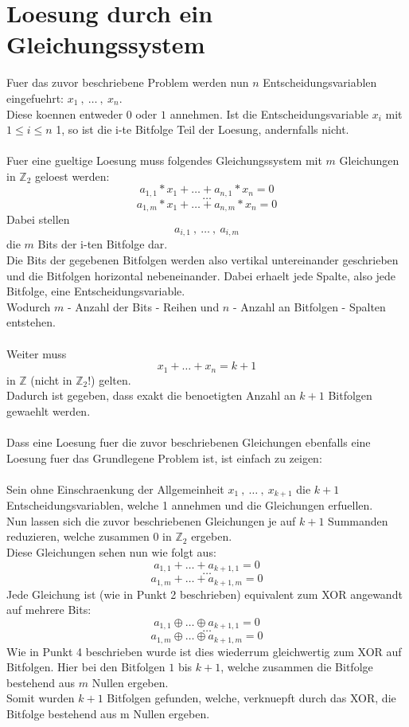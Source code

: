 \documentclass[a4paper,10pt,ngerman]{scrartcl}
\begin{document}
\section{Loesung durch ein Gleichungssystem}
Fuer das zuvor beschriebene Problem werden nun \(n\) Entscheidungsvariablen eingefuehrt: \(x_1 \ , \ \dots \ , \ x_n\).\\
Diese koennen entweder \(0\) oder \(1\) annehmen. Ist die Entscheidungsvariable \(x_i\) mit \(1 \leq i \leq n\) 1, so ist die i-te Bitfolge Teil der Loesung, andernfalls nicht.\\\\
Fuer eine gueltige Loesung muss folgendes Gleichungssystem mit \(m\) Gleichungen in \(\mathbb{Z}_{2}\) geloest werden:\\
\[a_{1, 1} * x_1 + \dots + a_{n, 1} * x_n = 0\]
\[\dots\]
\[a_{1, m} * x_1 + \dots + a_{n, m}  * x_n = 0\]
Dabei stellen 
\[a_{i, 1} \ , \ \dots \ , \ a_{i, m}\]
die \(m\) Bits der i-ten Bitfolge dar.\\
Die Bits der gegebenen Bitfolgen werden also vertikal untereinander geschrieben und die Bitfolgen horizontal nebeneinander. Dabei erhaelt jede Spalte, also jede Bitfolge, eine Entscheidungsvariable.\\
Wodurch \(m\) - Anzahl der Bits - Reihen und \(n\) - Anzahl an Bitfolgen - Spalten entstehen.\\\\
Weiter muss 
\[x_1 + \dots + x_n = k + 1\]
in \(\mathbb{Z}\) (nicht in \(\mathbb{Z}_{2}\)!) gelten.\\
Dadurch ist gegeben, dass exakt die benoetigten Anzahl an \(k + 1\) Bitfolgen gewaehlt werden.\\\\
Dass eine Loesung fuer die zuvor beschriebenen Gleichungen ebenfalls eine Loesung fuer das Grundlegene Problem ist, ist einfach zu zeigen:\\\\
Sein ohne Einschraenkung der Allgemeinheit \(x_1 \ , \ \dots \ , \ x_{k+1}\) die \(k + 1\) Entscheidungsvariablen, welche 1 annehmen und die Gleichungen erfuellen.\\
Nun lassen sich die zuvor beschriebenen Gleichungen je auf \(k + 1\) Summanden reduzieren, welche zusammen 0 in \(\mathbb{Z}_{2}\) ergeben.\\
Diese Gleichungen sehen nun wie folgt aus:
\[a_{1, 1} + \dots + a_{k+1, 1} = 0\]
\[\dots\]
\[a_{1, m} + \dots + a_{k+1, m} = 0\]
Jede Gleichung ist (wie in Punkt 2 beschrieben) equivalent zum XOR angewandt auf mehrere Bits:
\[a_{1, 1} \oplus \dots \oplus a_{k+1, 1} = 0\]
\[\dots\]
\[a_{1, m} \oplus \dots \oplus a_{k+1, m} = 0\]
Wie in Punkt 4 beschrieben wurde ist dies wiederrum gleichwertig zum XOR auf Bitfolgen. Hier bei den Bitfolgen \(1\) bis \(k + 1\), welche zusammen die Bitfolge bestehend aus \(m\) Nullen ergeben.\\
Somit wurden \(k + 1\) Bitfolgen gefunden, welche, verknuepft durch das XOR, die Bitfolge bestehend aus m Nullen ergeben.
\end{document}
